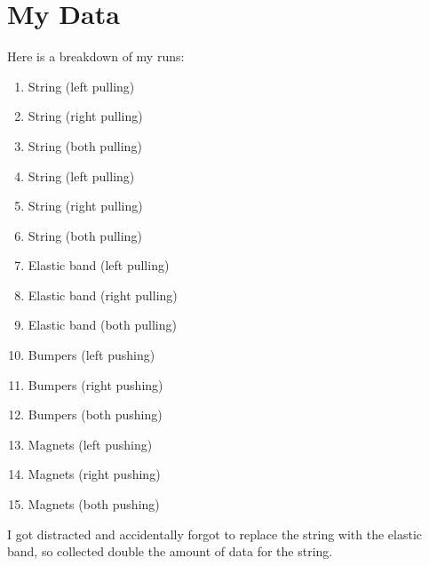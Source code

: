 \section{My Data}
%
Here is a breakdown of my runs:
\begin{enumerate}
    \item String (left pulling)
    \item String (right pulling)
    \item String (both pulling)
    \item String (left pulling)
    \item String (right pulling)
    \item String (both pulling)
    \item Elastic band (left pulling)
    \item Elastic band (right pulling)
    \item Elastic band (both pulling)
    \item Bumpers (left pushing)
    \item Bumpers (right pushing)
    \item Bumpers (both pushing)
    \item Magnets (left pushing)
    \item Magnets (right pushing)
    \item Magnets (both pushing)
\end{enumerate}
I got distracted and accidentally forgot to replace the string with the elastic band, so collected double the amount of data for the string.
%
